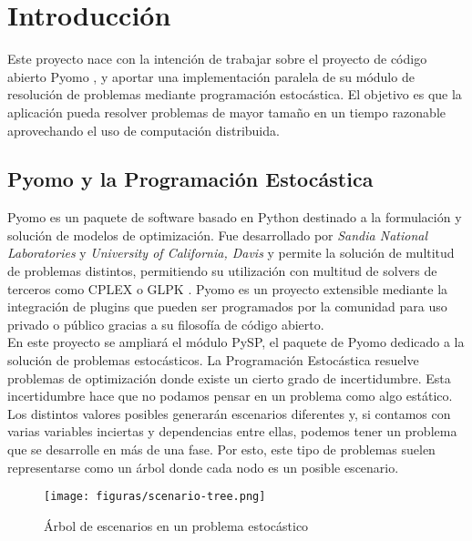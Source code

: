\chapter{Introducción}

Este proyecto nace con la intención de trabajar sobre el proyecto de código abierto Pyomo \cite{pyomo}, y aportar una implementación paralela de su módulo de resolución de problemas mediante programación estocástica. El objetivo es que la aplicación pueda resolver problemas de mayor tamaño en un tiempo razonable aprovechando el uso de computación distribuida.

\section{Pyomo y la Programación Estocástica}


Pyomo \cite{pyomo} es un paquete de software basado en Python destinado a la formulación y solución de modelos de optimización. Fue desarrollado por \textit{Sandia National Laboratories} y \textit{University of California, Davis} y permite la solución de multitud de problemas distintos, permitiendo su utilización con multitud de solvers de terceros como CPLEX \cite{cplex} o GLPK \cite{glpk}. Pyomo es un proyecto extensible mediante la integración de plugins que pueden ser programados por la comunidad para uso privado o público gracias a su filosofía de código abierto.\\

En este proyecto se ampliará el módulo PySP, el paquete de Pyomo dedicado a la solución de problemas estocásticos. La Programación Estocástica \cite{stochasticProgramming} resuelve problemas de optimización donde existe un cierto grado de incertidumbre. Esta incertidumbre hace que no podamos pensar en un problema como algo estático. Los distintos valores posibles generarán escenarios diferentes y, si contamos con varias variables inciertas y dependencias entre ellas, podemos tener un problema que se desarrolle en más de una fase. Por esto, este tipo de problemas suelen representarse como un árbol donde cada nodo es un posible escenario.\\

\begin{figure}[H]
    \centerline{\texttt{[image: figuras/scenario-tree.png]}}
    \caption{Árbol de escenarios en un problema estocástico}
    \label{fig:scenario-tree}
\end{figure}

